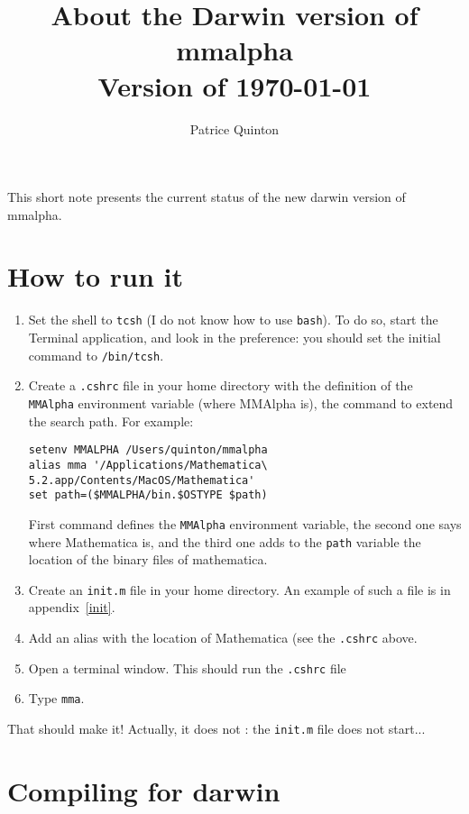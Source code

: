 \documentclass[11pt]{article}
\begin{document}
\newcommand{\mmalfa}{{\sc mmalpha}}
\newcommand{\dar}{{\sc darwin}}
\newcommand{\mma}{{\sc mathematica}}


\title{About the Darwin version of \mmalfa{}\\
Version of \today{}}
\author{Patrice Quinton}
\date{}
\maketitle
This short note presents the current status of the new \dar{} version of 
\mmalfa{}. 

\section{How to run it}
\begin{enumerate}
\item Set the shell to \texttt{tcsh} (I do not know how to use \texttt{bash}). To do so, 
start the Terminal application, and look in the preference: you should set the
initial command to \texttt{/bin/tcsh}.
\item Create a \texttt{.cshrc} file in your home directory with the definition 
of the \texttt{MMAlpha} environment variable (where MMAlpha is), the command
to extend the search path. For example:
\begin{verbatim}
setenv MMALPHA /Users/quinton/mmalpha
alias mma '/Applications/Mathematica\ 5.2.app/Contents/MacOS/Mathematica'
set path=($MMALPHA/bin.$OSTYPE $path)
\end{verbatim}
First command defines the \texttt{MMAlpha} environment variable, the second one says where
Mathematica is, and the third one adds to the \texttt{path} variable the 
location of the binary files of \mma{}.
\item Create an \texttt{init.m} file in your home directory. An example of such a file is
in appendix~\ref{init}.
\item Add an alias with the location of Mathematica (see the \texttt{.cshrc} above.
\item Open a terminal window. This should run the \texttt{.cshrc} file 
\item Type \texttt{mma}.
\end{enumerate}

That should make it! Actually, it does not : the \texttt{init.m} file does not start...

\section{Compiling for \dar{}}
\end{document}
